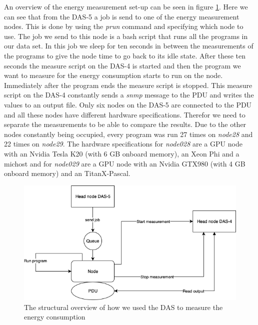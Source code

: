 An overview of the energy measurement set-up can be seen in figure \ref{fig:overview}. Here we can see that from the DAS-5 a job is send to one of the energy measurement nodes. This is done by using the \textit{prun} command and specifying which node to use. The job we send to this node is a bash script that runs all the programs in our data set. In this job we sleep for ten seconds in between the measurements of the programs to give the node time to go back to its idle state. After these ten seconds the measure script on the DAS-4 is started and then the program we want to measure for the energy consumption starts to run on the node. Immediately after the program ends the measure script is stopped. This measure script on the DAS-4 constantly sends a \textit{snmp} message to the PDU and writes the values to an output file. Only six nodes on the DAS-5 are connected to the PDU and all these nodes have different hardware specifications. Therefor we need to separate the measurements to be able to compare the results. Due to the other nodes constantly being occupied, every program was run 27 times on \textit{node28} and 22 times on \textit{node29}. The hardware specifications for \textit{node028} are a GPU node with an Nvidia Tesla K20 (with 6 GB onboard memory), an Xeon Phi and a michost and for \textit{node029} are a GPU node with an Nvidia GTX980 (with 4 GB onboard memory) and an TitanX-Pascal.


\begin{figure}[h]
    \centering
    \includegraphics[width=.6\textwidth]{graphs/das.png}
    \caption{The structural overview of how we used the DAS to measure the energy consumption}
    \label{fig:overview}
\end{figure}

